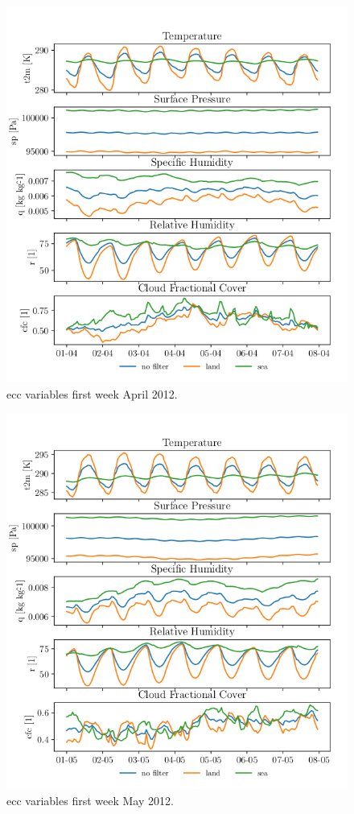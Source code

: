 \begin{figure}[ht]
    \centering
    \includegraphics{python_figs/spatially_averaged_one_week_from_2012-04-01.png}
    \caption{\acrshort{ecc} variables first week April 2012.}
    \label{fig:april12}
\end{figure}
\begin{figure}[ht]
    \centering
    \includegraphics{python_figs/spatially_averaged_one_week_from_2012-05-01.png}
    \caption{\acrshort{ecc} variables first week May 2012.}
    \label{fig:may12}
\end{figure}
